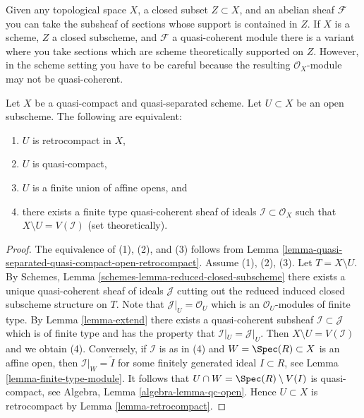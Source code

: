 \noindent
Given any topological space $X$, a closed subset $Z \subset X$, and an
abelian sheaf $\mathcal{F}$ you can take the subsheaf of sections whose
support is contained in $Z$. If $X$ is a scheme, $Z$ a closed
subscheme, and $\mathcal{F}$ a quasi-coherent module there is a variant
where you take sections which are scheme theoretically supported
on $Z$. However, in the scheme setting you have to be careful because
the resulting $\mathcal{O}_X$-module may not be quasi-coherent.

\begin{lemma}
\label{lemma-quasi-coherent-finite-type-ideals}
Let $X$ be a quasi-compact and quasi-separated scheme.
Let $U \subset X$ be an open subscheme. The following are equivalent:
\begin{enumerate}
\item $U$ is retrocompact in $X$,
\item $U$ is quasi-compact,
\item $U$ is a finite union of affine opens, and
\item there exists a finite type quasi-coherent sheaf of ideals
$\mathcal{I} \subset \mathcal{O}_X$ such that $X \setminus U = V(\mathcal{I})$
(set theoretically).
\end{enumerate}
\end{lemma}

\begin{proof}
The equivalence of (1), (2), and (3) follows from
Lemma \ref{lemma-quasi-separated-quasi-compact-open-retrocompact}.
Assume (1), (2), (3). Let $T = X \setminus U$. By
Schemes, Lemma \ref{schemes-lemma-reduced-closed-subscheme} there exists
a unique quasi-coherent sheaf of ideals $\mathcal{J}$ cutting
out the reduced induced closed subscheme structure on $T$.
Note that $\mathcal{J}|_U = \mathcal{O}_U$ which is an
$\mathcal{O}_U$-modules of finite type.
By Lemma \ref{lemma-extend} there exists a quasi-coherent subsheaf
$\mathcal{I} \subset \mathcal{J}$ which is of finite type
and has the property that $\mathcal{I}|_U = \mathcal{J}|_U$.
Then $X \setminus U = V(\mathcal{I})$ and we obtain (4). Conversely,
if $\mathcal{I}$ is as in (4) and $W = \Spec(R) \subset X$ is an affine
open, then $\mathcal{I}|_W = \widetilde{I}$ for some finitely generated
ideal $I \subset R$, see Lemma \ref{lemma-finite-type-module}.
It follows that $U \cap W = \Spec(R) \setminus V(I)$ is quasi-compact,
see Algebra, Lemma \ref{algebra-lemma-qc-open}. Hence $U \subset X$
is retrocompact by Lemma \ref{lemma-retrocompact}.
\end{proof}

